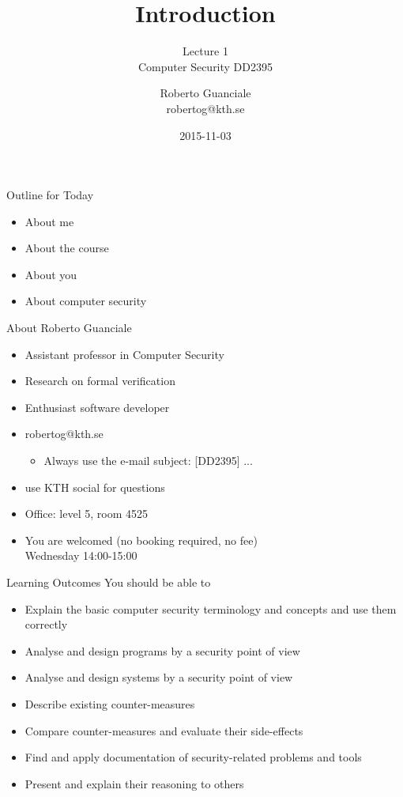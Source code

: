 \documentclass{beamer}
\title{Introduction}
\subtitle{Lecture 1 \\ Computer Security DD2395}
\author[R. Guanciale]{
  Roberto Guanciale\\
  robertog@kth.se
}
\date{2015-11-03}
\begin{document}
\begin{frame}[plain]
  \titlepage
\end{frame}

\begin{frame}{Outline for Today}
  \begin{itemize}
    \item About me
    \item About the course
    \item About you
    \item About computer security
  \end{itemize}
\end{frame}

\begin{frame}{About Roberto Guanciale}
  \begin{itemize}
    \item Assistant professor in Computer Security
    \item Research on formal verification
    \item Enthusiast software developer
    \item robertog@kth.se
      \begin{itemize}
      \item \alert{Always} use the e-mail subject: [DD2395] ...
      \end{itemize}
    \item use KTH social for questions
    \item Office: level 5, room 4525
    \item You are welcomed (no booking required, no fee)\\
      Wednesday 14:00-15:00
  \end{itemize}
\end{frame}

\begin{frame}{Learning Outcomes}
  You should be able to
  \begin{itemize}
    \item Explain the basic computer security terminology and concepts and use them correctly
    \item Analyse and design programs by a security point of view
    \item Analyse and design systems by a security point of view
    \item Describe existing counter-measures
    \item Compare counter-measures and evaluate their side-effects
    \item Find and apply documentation of security-related problems and tools
    \item Present and explain their reasoning to others
  \end{itemize}
\end{frame}
\end{document}
